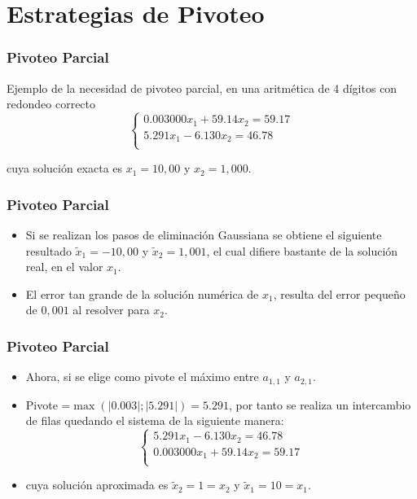 \documentclass{beamer}
\begin{document}
\section{Estrategias de Pivoteo}
\begin{frame}
  \frametitle{Pivoteo Parcial}
  Ejemplo de la necesidad de pivoteo parcial, en una aritm\'etica de 4 d\'igitos con redondeo correcto
$$
\left\{\begin{array}{l}
        0.003000x_1 + 59.14x_2 = 59.17\\
	5.291x_1-6.130x_2=46.78\\
       \end{array}\right.
$$

cuya soluci\'on exacta es $x_1=10,00$ y $x_2=1,000$.

\end{frame}
\begin{frame}
\frametitle{Pivoteo Parcial}
\begin{itemize}
  \item Si se realizan los pasos de eliminaci\'on Gaussiana se obtiene el siguiente resultado $\tilde{x}_1 = -10,00$ y $\tilde{x}_2=1,001$, el cual difiere bastante de la soluci\'on real, en el valor $x_1$.

  \item<2-> El error tan grande de la soluci\'on num\'erica de $x_1$, resulta del error peque\~no de $0,001$ al resolver para $x_2$.
\end{itemize}
  
\end{frame}
\begin{frame}
\frametitle{Pivoteo Parcial}
\begin{itemize}
  \item<1-> Ahora, si se elige como pivote
  el m\'aximo entre $a_{1,1}$ y $a_{2,1}$.
  
  \item<2-> Pivote =$ \max(|0.003|;|5.291|)=5.291$, por tanto se realiza un intercambio de filas quedando el sistema de la siguiente manera:
  $$
  \left\{\begin{array}{l}
    5.291x_1-6.130x_2=46.78\\
          0.003000x_1 + 59.14x_2 = 59.17\\
         \end{array}\right.
  $$
  \item<3-> cuya soluci\'on aproximada es $\tilde x_2 = 1 = x_2$ y  $\tilde x_1 = 10 = x_1$.
  \end{itemize}
\end{frame}
\end{document}

